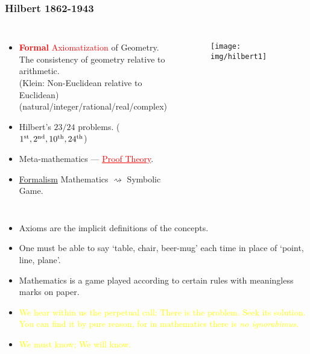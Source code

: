 \documentclass[UTF8,aspectratio=43,11pt,colorlinks,compress,openany]{beamer}%
\begin{document}
\begin{frame}\frametitle{Hilbert 1862-1943}
	\begin{columns}[onlytextwidth]
	\begin{itemize}
		\item \textcolor{red}{\textbf{Formal} Axiomatization} of Geometry.\\
		The consistency of geometry relative to arithmetic.\\
		(Klein: Non-Euclidean relative to Euclidean)\\
		(natural/integer/rational/real/complex)
		\item Hilbert's $23/24$ problems. ($1\textsuperscript{st}, 2\textsuperscript{nd}, 10\textsuperscript{th}, 24\textsuperscript{th}$)
		\item Meta-mathematics --- \textcolor{red}{\underline{Proof Theory}}.
		\item \colorbox{green!30}{\underline{Formalism}} Mathematics $\rightsquigarrow$ Symbolic Game.
	\end{itemize}
			\begin{figure}
				\texttt{[image: img/hilbert1]}
			\end{figure}
	\end{columns}
		\begin{block}{}
			\begin{itemize}\small
			\item Axioms are the implicit definitions of the concepts.
			\item One must be able to say `table, chair, beer-mug' each time in place of `point, line, plane'.
			\item Mathematics is a game played according to certain rules with meaningless marks on paper.
			\item \textcolor{yellow}{We hear within us the perpetual call: There is the problem. Seek its solution. You can find it by pure reason, for in mathematics there is \emph{no ignorabimus}.}
			\item \textcolor{yellow}{We must know; We will know.}
			\end{itemize}
		\end{block}
\end{frame}
\end{document}
